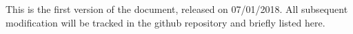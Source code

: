 This is the first version of the document, released on 07/01/2018.
All subsequent modification will be tracked in the github repository and briefly listed here.